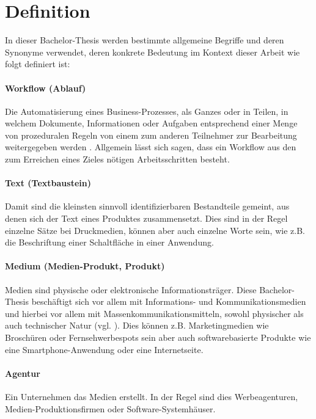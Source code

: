 \section{Definition}
\label{l:def}

In dieser Bachelor-Thesis werden bestimmte allgemeine Begriffe und deren Synonyme verwendet, deren konkrete Bedeutung im Kontext dieser Arbeit wie folgt definiert ist:

\paragraph{Workflow (Ablauf)} Die Automatisierung eines Business-Prozesses, als Ganzes oder in Teilen, in welchem Dokumente, Informationen oder Aufgaben entsprechend einer Menge von prozeduralen Regeln von einem zum anderen Teilnehmer zur Bearbeitung weitergegeben werden \cite[S.8]{wmc}. Allgemein lässt sich sagen, dass ein Workflow aus den zum Erreichen eines Zieles nötigen Arbeitsschritten besteht.

\paragraph{Text (Textbaustein)} Damit sind die kleinsten sinnvoll identifizierbaren Bestandteile gemeint, aus denen sich der Text eines Produktes zusammensetzt. Dies sind in der Regel einzelne Sätze bei Druckmedien, können aber auch einzelne Worte sein, wie z.B. die Beschriftung einer Schaltfläche in einer Anwendung.

\paragraph{Medium (Medien-Produkt, Produkt)} Medien sind physische oder elektronische Informationsträger. Diese Bachelor-Thesis beschäftigt sich vor allem mit Informations- und Kommunikationsmedien und hierbei vor allem mit Massenkommunikationsmitteln, sowohl physischer als auch technischer Natur (vgl. \cite[S.199--201]{schanze2002metzler}). Dies können z.B. Marketingmedien wie Broschüren oder Fernsehwerbespots sein aber auch softwarebasierte Produkte wie eine Smartphone-Anwendung oder eine Internetseite. 

\paragraph{Agentur} Ein Unternehmen das Medien erstellt. In der Regel sind dies Werbeagenturen, Medien-Produktionsfirmen oder Software-Systemhäuser. 

